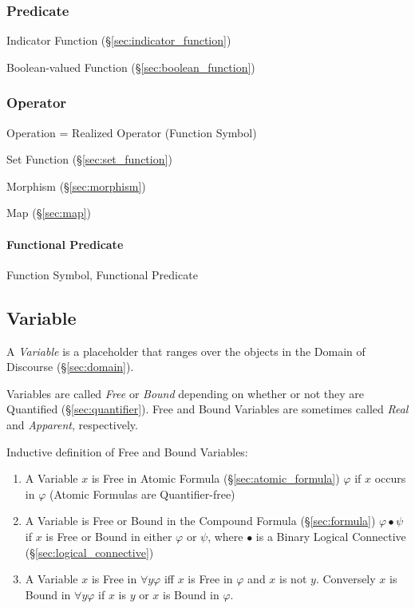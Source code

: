 \subsubsection{Predicate}\label{sec:predicate}

Indicator Function (\S\ref{sec:indicator_function})

Boolean-valued Function (\S\ref{sec:boolean_function})



\subsubsection{Operator}\label{sec:operator}

Operation = Realized Operator (Function Symbol)

Set Function (\S\ref{sec:set_function})

Morphism (\S\ref{sec:morphism})

Map (\S\ref{sec:map})



\paragraph{Functional Predicate}\label{sec:functional_predicate}\hfill

Function Symbol, Functional Predicate



\subsection{Variable}\label{sec:variable}

A \emph{Variable} is a placeholder that ranges over the objects in the
Domain of Discourse (\S\ref{sec:domain}).

Variables are called \emph{Free} or \emph{Bound} depending on whether
or not they are Quantified (\S\ref{sec:quantifier}). Free and Bound
Variables are sometimes called \emph{Real} and \emph{Apparent},
respectively.

Inductive definition of Free and Bound Variables:
\begin{enumerate}
\item A Variable $x$ is Free in Atomic Formula
  (\S\ref{sec:atomic_formula}) $\varphi$ if $x$ occurs in $\varphi$
  (Atomic Formulas are Quantifier-free)
\item A Variable is Free or Bound in the Compound Formula
  (\S\ref{sec:formula}) $\varphi \bullet \psi$ if $x$ is Free or Bound
  in either $\varphi$ or $\psi$, where $\bullet$ is a Binary Logical
  Connective (\S\ref{sec:logical_connective})
\item A Variable $x$ is Free in $\forall y \varphi$ iff $x$ is Free in
  $\varphi$ and $x$ is not $y$. Conversely $x$ is Bound in $\forall y
  \varphi$ if $x$ is $y$ or $x$ is Bound in $\varphi$.
\end{enumerate}


